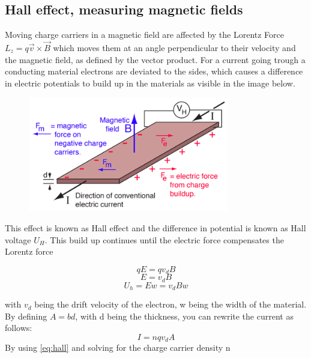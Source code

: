 \documentclass[12pt]{article}
\begin{document}
	\subsection{Hall effect, measuring magnetic fields}
	Moving charge carriers in a magnetic field are affected by the Lorentz Force $L_z=q\vec{v}\times \vec{B}$ which moves them at an angle perpendicular to their velocity and the magnetic field, as defined by the vector product. For a current going trough a conducting material electrons are deviated to the sides, which causes a difference in electric potentials to build up in the materials as visible in the image below.
		\begin{center}
	
		\begin{figure}[h]\label{fig:hall}
		\centering
		\includegraphics[height=5cm]{halleffect.jpg}
		\end{figure}
		\end{center}
	
	This effect is known as Hall effect and the difference in potential is known as Hall voltage $U_H$. This build up continues until the electric force compensates the Lorentz force
	
	\begin{equation}
		qE = q v_d B
	\end{equation}
	\begin{equation}
		E = v_dB
	\end{equation}
	\begin{equation} \label{eq:hall}
		U_h =  E w = v_d B w
	\end{equation}

	with $v_d$ being the drift velocity of the electron, w being the width of the material. By defining $A=bd$, with d being the thickness, you can rewrite the current as follows:
	\begin{equation}
		I = nqv_d A
	\end{equation}
	By using \ref{eq:hall} and solving for the charge carrier density n
	
\end{document}

